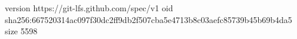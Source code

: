 version https://git-lfs.github.com/spec/v1
oid sha256:667520314ac097f30dc2ff9db2f507cba5e4713b8c03aefc85739b45b69b4da5
size 5598
